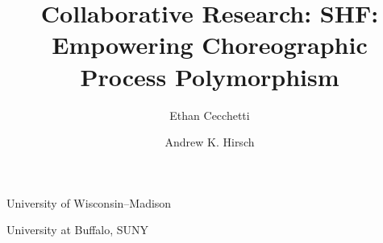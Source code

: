 

\title{Collaborative Research: SHF: \\ Empowering Choreographic Process Polymorphism}
\author{Ethan Cecchetti}{University of Wisconsin--Madison}
\author{Andrew K. Hirsch}{University at Buffalo, SUNY}



\newtheorem{goal}{Goal}


\newpage





